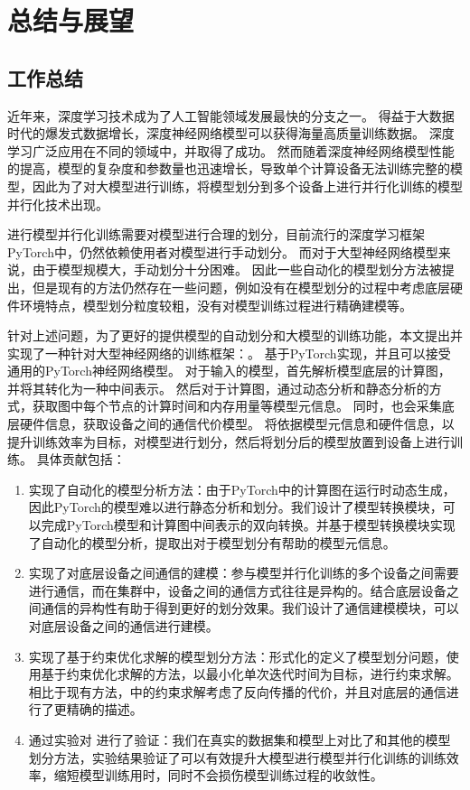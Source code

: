 
\chapter{总结与展望}
\label{sec:summary}

\section{工作总结}
近年来，深度学习技术成为了人工智能领域发展最快的分支之一。
得益于大数据时代的爆发式数据增长，深度神经网络模型可以获得海量高质量训练数据。
深度学习广泛应用在不同的领域中，并取得了成功。
然而随着深度神经网络模型性能的提高，模型的复杂度和参数量也迅速增长，导致单个计算设备无法训练完整的模型，因此为了对大模型进行训练，将模型划分到多个设备上进行并行化训练的模型并行化技术出现。

进行模型并行化训练需要对模型进行合理的划分，目前流行的深度学习框架PyTorch中，仍然依赖使用者对模型进行手动划分。
而对于大型神经网络模型来说，由于模型规模大，手动划分十分困难。
因此一些自动化的模型划分方法被提出，但是现有的方法仍然存在一些问题，例如没有在模型划分的过程中考虑底层硬件环境特点，模型划分粒度较粗，没有对模型训练过程进行精确建模等。

针对上述问题，为了更好的提供模型的自动划分和大模型的训练功能，本文提出并实现了一种针对大型神经网络的训练框架：\sys{}。
\sys{}基于PyTorch实现，并且可以接受通用的PyTorch神经网络模型。
对于输入的模型，\sys{}首先解析模型底层的计算图，并将其转化为一种中间表示。
然后对于计算图，\sys{}通过动态分析和静态分析的方式，获取图中每个节点的计算时间和内存用量等模型元信息。
同时，\sys{}也会采集底层硬件信息，获取设备之间的通信代价模型。
\sys{}将依据模型元信息和硬件信息，以提升训练效率为目标，对模型进行划分，然后将划分后的模型放置到设备上进行训练。
具体贡献包括：
\begin{enumerate}
	\item 实现了自动化的模型分析方法：由于PyTorch中的计算图在运行时动态生成，因此PyTorch的模型难以进行静态分析和划分。我们设计了模型转换模块，可以完成PyTorch模型和计算图中间表示的双向转换。并基于模型转换模块实现了自动化的模型分析，提取出对于模型划分有帮助的模型元信息。
	\item 实现了对底层设备之间通信的建模：参与模型并行化训练的多个设备之间需要进行通信，而在集群中，设备之间的通信方式往往是异构的。结合底层设备之间通信的异构性有助于得到更好的划分效果。我们设计了通信建模模块，可以对底层设备之间的通信进行建模。
	\item 实现了基于约束优化求解的模型划分方法：\sys{}形式化的定义了模型划分问题，使用基于约束优化求解的方法，以最小化单次迭代时间为目标，进行约束求解。相比于现有方法，\sys{}中的约束求解考虑了反向传播的代价，并且对底层的通信进行了更精确的描述。
	\item 通过实验对\sys{} 进行了验证：我们在真实的数据集和模型上对比了\sys{}和其他的模型划分方法，实验结果验证了\sys{}可以有效提升大模型进行模型并行化训练的训练效率，缩短模型训练用时，同时不会损伤模型训练过程的收敛性。
\end{enumerate}


